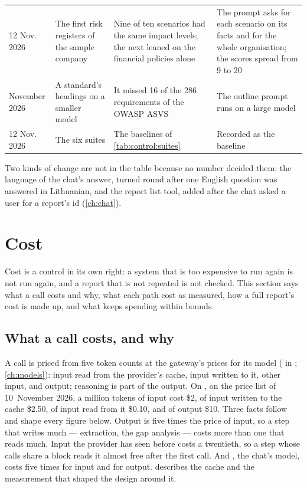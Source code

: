\begin{xltabular}{\textwidth}{@{}L{17mm}L{37mm}YL{37mm}@{}}
12 Nov. 2026 & The first risk registers of the sample company & Nine of ten scenarios had the same impact levels; the next leaned on the financial policies alone & The prompt asks for each scenario on its facts and for the whole organisation; the scores spread from 9 to 20 \\
November 2026 & A standard's headings on a smaller model & It missed 16 of the 286 requirements of the OWASP ASVS & The outline prompt runs on a large model \\
12 Nov. 2026 & The six suites & The baselines of \cref{tab:control:suites} & Recorded as the baseline \\
\end{xltabular}

Two kinds of change are not in the table because no number decided them: the language of the
chat's answer, turned round after one English question was answered in Lithuanian, and the
report list tool, added after the chat asked a user for a report's id (\cref{ch:chat}).


\section{Cost}\label{sec:control:cost}

Cost is a control in its own right: a system that is too expensive to run again is not run
again, and a report that is not repeated is not checked. This section says what a call costs
and why, what each path cost as measured, how a full report's cost is made up, and what keeps
spending within bounds.

\subsection{What a call costs, and why}

A call is priced from five token counts at the gateway's prices for its model
( in ; \cref{ch:models}): input read from the provider's
cache, input written to it, other input, and output; reasoning is part of the output. On
, on the price list of 10~November 2026, a million tokens of input cost
\$2, of input written to the cache \$2.50, of input read from it \$0.10, and of output \$10.
Three facts follow and shape every figure below. Output is five times the price of input, so a
step that writes much --- extraction, the gap analysis --- costs more than one that reads
much. Input the provider has seen before costs a twentieth, so a step whose calls share a
block reads it almost free after the first call. And , the chat's model,
costs five times  for input and for output.  describes the cache and
the measurement that shaped the design around it.

